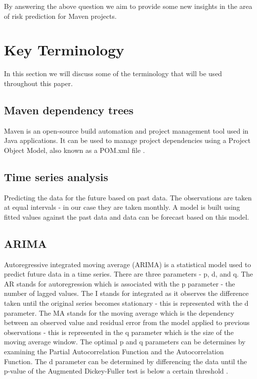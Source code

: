 \documentclass[conference]{IEEEtran}
\begin{document}
By answering the above question we aim to provide some new insights in the area of risk prediction for Maven projects. 

\section{Key Terminology}
In this section we will discuss some of the terminology that will be used throughout this paper. \\

\subsection{Maven dependency trees}
Maven is an open-source build automation and project management tool used in Java applications. It can be used to manage project dependencies using a Project Object Model, also known as a POM.xml file \cite{noauthor_maven_nodate}. 

\subsection{Time series analysis} 
Predicting the data for the future based on past data. The observations are taken at equal intervals - in our case they are taken monthly. A model is built using fitted values against the past data and data can be forecast based on this model. 

\subsection{ARIMA}
Autoregressive integrated moving average (ARIMA) is a statistical model used to predict future data in a time series. There are three parameters - p, d, and q. The AR stands for autoregression which is associated with the p parameter - the number of lagged values. The I stands for integrated as it observes the difference taken until the original series becomes stationary - this is represented with the d parameter. The MA stands for the moving average which is the dependency between an observed value and residual error from the model applied to previous observations - this is represented in the q parameter which is the size of the moving average window. The optimal p and q parameters can be determines by examining the Partial Autocorrelation Function and the Autocorrelation Function. The d parameter can be determined by differencing the data until the p-value of the Augmented Dickey-Fuller test is below a certain threshold \cite{a_a_ariyo_stock_2014}.
\end{document}
